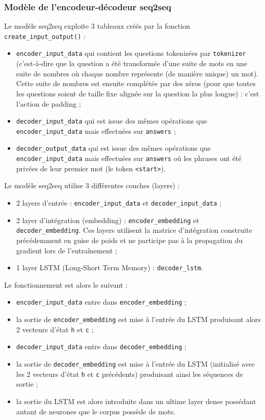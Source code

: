 \documentclass[10pt,a4paper]{article}
\newcommand\tab[1][0.5cm]{\hspace*{#1}}
\begin{document}
\subsubsection{Modèle de l'encodeur-décodeur seq2seq}
Le modèle seq2seq exploite 3 tableaux créés par la fonction \texttt{create\_input\_output()} :
\begin{itemize}
\item \texttt{encoder\_input\_data} qui contient les questions tokenizées par \texttt{tokenizer} (c'est-à-dire que la question a été transformée d'une suite de mots en une suite de nombres où chaque nombre représente (de manière unique) un mot). Cette suite de nombres est ensuite complétée par des zéros (pour que toutes les questions soient de taille fixe alignée sur la question la plus longue) : c'est l'action de padding ;
\item \texttt{decoder\_input\_data} qui est issue des mêmes opérations que \texttt{encoder\_input\_data} mais effectuées sur \texttt{answers} ;
\item \texttt{decoder\_output\_data} qui est issue des mêmes opérations que \texttt{encoder\_input\_data} mais effectuées sur \texttt{answers} où les phrases ont été privées de leur premier mot (le token \texttt{<start>}).
\end{itemize}
\tab Le modèle seq2seq utilise 3 différentes couches (layers) :
\begin{itemize}
\item 2 layers d'entrée : \texttt{encoder\_input\_data} et \texttt{decoder\_input\_data} ;
\item 2 layer d'intégration (embedding) : \texttt{encoder\_embedding} et \texttt{decoder\_embedding}. Ces layers utilisent la matrice d'intégration construite précédemment en guise de poids et ne participe pas à la propagation du gradient lors de l'entraînement ;
\item 1 layer LSTM (Long-Short Term Memory) : \texttt{decoder\_lstm}.
\end{itemize}
Le fonctionnement est alors le suivant :
\begin{itemize}
\item \texttt{encoder\_input\_data} entre dans \texttt{encoder\_embedding} ;
\item la sortie de \texttt{encoder\_embedding} est mise à l'entrée du LSTM produisant alors 2 vecteurs d'état \texttt{h} et \texttt{c} ;
\item \texttt{decoder\_input\_data} entre dans \texttt{decoder\_embedding} ;
\item la sortie de \texttt{decoder\_embedding} est mise à l'entrée du LSTM (initialisé avec les 2 vecteurs d'état \texttt{h} et \texttt{c} précédents) produisant ainsi les séquences de sortie ;
\item la sortie du LSTM est alors introduite dans un ultime layer dense possédant autant de neurones que le corpus possède de mots.
\end{itemize}
\end{document}
